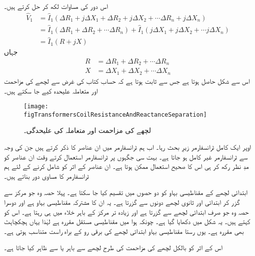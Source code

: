اس دور کی مساوات لکھ کر حل کرتے ہیں۔
\begin{align*}
\hat{V}_1&=\hat{I}_1 \left(\Delta R_1 + j \Delta X_1 +\Delta R_2 + j \Delta X_2 + \cdots \Delta R_n + j \Delta X_n   \right)\\
&=\hat{I}_1 \left(\Delta R_1 +\Delta R_2 +\cdots \Delta R_n   \right)+\hat{I}_1 \left(j \Delta X_1 + j \Delta X_2+\cdots   j \Delta X_n   \right)\\
&=\hat{I}_1 \left( R +j X \right)
\end{align*}
جہاں
\begin{align*}
R&=\Delta R_1 +\Delta R_2 +\cdots \Delta R_n\\
X&=\Delta X_1 + \Delta X_2 +\cdots   \Delta X_n
\end{align*}
اس سے  شکل   حاصل ہوتا ہے  جس سے  ثابت ہوتا ہے کہ حساب کتاب کی غرض سے لچھے کی مزاحمت اور متعاملہ علیحدہ کیے جا سکتے ہیں۔
\begin{figure}
\centering
\texttt{[image: figTransformersCoilResistanceAndReactanceSeparation]}
\caption{لچھے کی مزاحمت اور متعاملہ کی علیحدگی۔}
\label{شکل_ٹرانسفارمر_لچھے_کی_مزاحمت_اور_متعاملہ_کی_علیحدگی}
\end{figure}
%
اوپر ایک کامل ٹرانسفارمر زیرِ بحث رہا۔ اب ہم ٹرانسفارمر میں ان عناصر کا ذکر کرتے ہیں جن کی وجہ سے ٹرانسفارمر غیر کامل ہو جاتا ہے۔ بہت سی جگہوں پر ٹرانسفارمر استعمال کرتے وقت ان عناصر کو مدِ نظر رکھ کر ہی اس کا صحیح استعمال ممکن ہوتا ہے۔ ان عناصر کے اثر کو شامل کرنے کے لئے ہم  ٹرانسفارمر کا مساوی دور بناتے ہیں۔

ابتدائی لچھے کے مقناطیسی بہاو کو دو حصوں میں تقسیم کیا جا سکتا ہے۔ پہلا حصہ وہ جو مرکز سے گزر کر ابتدائی اور ثانوی لچھے دونوں سے گزرتا ہے۔ یہ ان کا مشترکہ مقناطیسی بہاو ہے اور دوسرا حصہ وہ جو صرف ابتدائی لچھے سے گزرتا ہے اور زیادہ تر مرکز کے باہر خلاء میں ہی رہتا ہے۔  اس کو    کہتے ہیں۔ یہ شکل میں دکھایا گیا ہے۔ چونکہ ہوا میں مقناطیسی مستقل  مقررہ ہے لہٰذا یہاں ہچکچاہٹ بھی مقررہ ہے۔  یوں رستا مقناطیسی بہاو ابتدائی لچھے کی برقی رو کے  براہ راست متناسب ہوتی ہے۔

 اس کے اثر کو بالکل لچھے کی مزاحمت کی طرح لچھے سے باہر   یا    سے ظاہر کیا جاتا ہے۔

